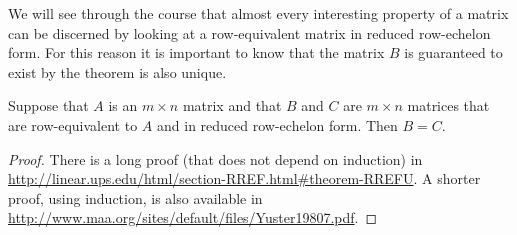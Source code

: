 \documentclass{ximera}
\begin{document}
We will see through the course that almost every interesting property
of a matrix can be discerned by looking at a row-equivalent matrix in
reduced row-echelon form.  For this reason it is important to know
that the matrix $B$ is guaranteed to exist by the theorem is also
unique.

\begin{theorem}
Suppose that $A$ is an $m\times n$ matrix and that $B$ and $C$ are $m\times n$ matrices that are row-equivalent to $A$ and in reduced row-echelon form.  Then $B=C$.

\begin{proof}
There is a long proof (that does not depend on induction) in \href{the textbook}{http://linear.ups.edu/html/section-RREF.html\#theorem-RREFU}.  A shorter proof, using induction, is also available in \href{a short paper}{http://www.maa.org/sites/default/files/Yuster19807.pdf}.
\end{proof}
\end{theorem}
\end{document}
